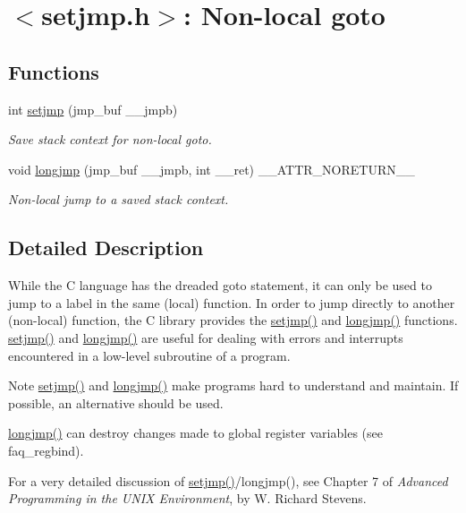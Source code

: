 \hypertarget{group__setjmp}{}\section{$<$setjmp.\+h$>$\+: Non-\/local goto}
\label{group__setjmp}
\subsection*{Functions}
\begin{DoxyCompactItemize}
\item 
int \hyperlink{group__setjmp_ga2687c5ef7a3f376db90908999a9a7fc6}{setjmp} (jmp\+\_\+buf \+\_\+\+\_\+jmpb)
\begin{DoxyCompactList}\small\item\em Save stack context for non-\/local goto. \end{DoxyCompactList}\item 
void \hyperlink{group__setjmp_ga87f44eafaab5ec0ef8f5a11a8b853acf}{longjmp} (jmp\+\_\+buf \+\_\+\+\_\+jmpb, int \+\_\+\+\_\+ret) \+\_\+\+\_\+\+A\+T\+T\+R\+\_\+\+N\+O\+R\+E\+T\+U\+R\+N\+\_\+\+\_\+
\begin{DoxyCompactList}\small\item\em Non-\/local jump to a saved stack context. \end{DoxyCompactList}\end{DoxyCompactItemize}


\subsection{Detailed Description}
While the C language has the dreaded {\ttfamily goto} statement, it can only be used to jump to a label in the same (local) function. In order to jump directly to another (non-\/local) function, the C library provides the \hyperlink{group__setjmp_ga2687c5ef7a3f376db90908999a9a7fc6}{setjmp()} and \hyperlink{group__setjmp_ga87f44eafaab5ec0ef8f5a11a8b853acf}{longjmp()} functions. \hyperlink{group__setjmp_ga2687c5ef7a3f376db90908999a9a7fc6}{setjmp()} and \hyperlink{group__setjmp_ga87f44eafaab5ec0ef8f5a11a8b853acf}{longjmp()} are useful for dealing with errors and interrupts encountered in a low-\/level subroutine of a program.

\begin{DoxyNote}{Note}
\hyperlink{group__setjmp_ga2687c5ef7a3f376db90908999a9a7fc6}{setjmp()} and \hyperlink{group__setjmp_ga87f44eafaab5ec0ef8f5a11a8b853acf}{longjmp()} make programs hard to understand and maintain. If possible, an alternative should be used.

\hyperlink{group__setjmp_ga87f44eafaab5ec0ef8f5a11a8b853acf}{longjmp()} can destroy changes made to global register variables (see faq\+\_\+regbind).
\end{DoxyNote}
For a very detailed discussion of \hyperlink{group__setjmp_ga2687c5ef7a3f376db90908999a9a7fc6}{setjmp()}/longjmp(), see Chapter 7 of {\itshape Advanced Programming in the U\+N\+IX Environment}, by W. Richard Stevens.

